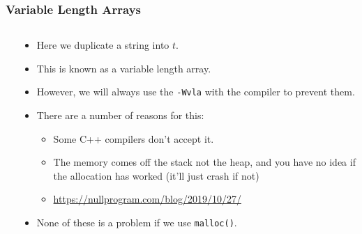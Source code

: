 \begin{frame}[fragile]
\frametitle{Variable Length Arrays}
\begin{columns}[T]

\begin{column}{0.35\textwidth}

\end{column}

\pause
\begin{column}{0.55\textwidth}
\begin{itemize}[<+->]
\item Here we duplicate a string into $t$.
\item This is known as a variable length array.
\item However, we will always use the \verb^-Wvla^ with the compiler to prevent them.
\item There are a number of reasons for this:
\begin{itemize}[<+->]
\item Some C++ compilers don't accept it.
\item The memory comes off the stack not the heap, and
you have no idea if the allocation has worked (it'll just crash if not)
\item \url{https://nullprogram.com/blog/2019/10/27/}
\end{itemize}
\item None of these is a problem if we use \verb^malloc()^.
\end{itemize}
\end{column}

\end{columns}
\end{frame}




